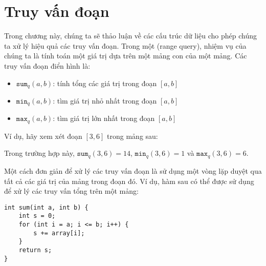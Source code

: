 \chapter{Truy vấn đoạn}


Trong chương này, chúng ta sẽ thảo luận về các cấu trúc dữ liệu
cho phép chúng ta xử lý hiệu quả các truy vấn đoạn.
Trong một  (range query),
nhiệm vụ của chúng ta là tính toán một giá trị
dựa trên một mảng con của một mảng.
Các truy vấn đoạn điển hình là:
\begin{itemize}
\item $\texttt{sum}_q(a,b)$: tính tổng các giá trị trong đoạn $[a,b]$
\item $\texttt{min}_q(a,b)$: tìm giá trị nhỏ nhất trong đoạn $[a,b]$
\item $\texttt{max}_q(a,b)$: tìm giá trị lớn nhất trong đoạn $[a,b]$
\end{itemize}

Ví dụ, hãy xem xét đoạn $[3,6]$ trong mảng sau:
\begin{center}
\end{center}
Trong trường hợp này, $\texttt{sum}_q(3,6)=14$,
$\texttt{min}_q(3,6)=1$ và $\texttt{max}_q(3,6)=6$.

Một cách đơn giản để xử lý các truy vấn đoạn là sử dụng
một vòng lặp duyệt qua tất cả các giá trị của mảng trong đoạn đó.
Ví dụ, hàm sau có thể được
sử dụng để xử lý các truy vấn tổng trên một mảng:

\begin{lstlisting}
int sum(int a, int b) {
    int s = 0;
    for (int i = a; i <= b; i++) {
        s += array[i];
    }
    return s;
}
\end{lstlisting}

